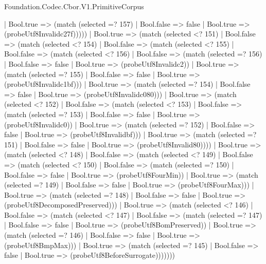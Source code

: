 \begin{lexlean}{Foundation.Codec.Cbor.V1.PrimitiveCorpus}
\begin{semanticmodule}
{                | Bool.true => (match (selected =? 157)
                  | Bool.false => false
                  | Bool.true => (probeUtf8Invalidc27f)))))
          | Bool.true => (match (selected <? 151)
            | Bool.false => (match (selected <? 154)
              | Bool.false => (match (selected <? 155)
                | Bool.false => (match (selected <? 156)
                  | Bool.false => (match (selected =? 156)
                    | Bool.false => false
                    | Bool.true => (probeUtf8Invalidc2))
                  | Bool.true => (match (selected =? 155)
                    | Bool.false => false
                    | Bool.true => (probeUtf8Invalidc1bf)))
                | Bool.true => (match (selected =? 154)
                  | Bool.false => false
                  | Bool.true => (probeUtf8Invalidc080)))
              | Bool.true => (match (selected <? 152)
                | Bool.false => (match (selected <? 153)
                  | Bool.false => (match (selected =? 153)
                    | Bool.false => false
                    | Bool.true => (probeUtf8Invalidc0))
                  | Bool.true => (match (selected =? 152)
                    | Bool.false => false
                    | Bool.true => (probeUtf8Invalidbf)))
                | Bool.true => (match (selected =? 151)
                  | Bool.false => false
                  | Bool.true => (probeUtf8Invalid80))))
            | Bool.true => (match (selected <? 148)
              | Bool.false => (match (selected <? 149)
                | Bool.false => (match (selected <? 150)
                  | Bool.false => (match (selected =? 150)
                    | Bool.false => false
                    | Bool.true => (probeUtf8FourMin))
                  | Bool.true => (match (selected =? 149)
                    | Bool.false => false
                    | Bool.true => (probeUtf8FourMax)))
                | Bool.true => (match (selected =? 148)
                  | Bool.false => false
                  | Bool.true => (probeUtf8DecomposedPreserved)))
              | Bool.true => (match (selected <? 146)
                | Bool.false => (match (selected <? 147)
                  | Bool.false => (match (selected =? 147)
                    | Bool.false => false
                    | Bool.true => (probeUtf8BomPreserved))
                  | Bool.true => (match (selected =? 146)
                    | Bool.false => false
                    | Bool.true => (probeUtf8BmpMax)))
                | Bool.true => (match (selected =? 145)
                  | Bool.false => false
                  | Bool.true => (probeUtf8BeforeSurrogate)))))))
}
\end{semanticmodule}
\end{lexlean}
